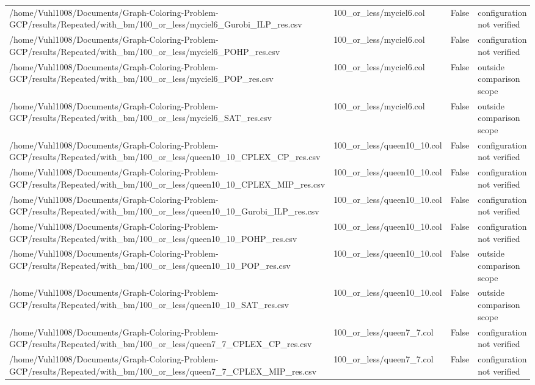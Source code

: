 \begin{table}[htbp]
\begin{tabular}{llll}
/home/Vuhl1008/Documents/Graph-Coloring-Problem-GCP/results/Repeated/with\_bm/100\_or\_less/myciel6\_Gurobi\_ILP\_res.csv & 100\_or\_less/myciel6.col & False & configuration not verified \\
/home/Vuhl1008/Documents/Graph-Coloring-Problem-GCP/results/Repeated/with\_bm/100\_or\_less/myciel6\_POHP\_res.csv & 100\_or\_less/myciel6.col & False & configuration not verified \\
/home/Vuhl1008/Documents/Graph-Coloring-Problem-GCP/results/Repeated/with\_bm/100\_or\_less/myciel6\_POP\_res.csv & 100\_or\_less/myciel6.col & False & outside comparison scope \\
/home/Vuhl1008/Documents/Graph-Coloring-Problem-GCP/results/Repeated/with\_bm/100\_or\_less/myciel6\_SAT\_res.csv & 100\_or\_less/myciel6.col & False & outside comparison scope \\
/home/Vuhl1008/Documents/Graph-Coloring-Problem-GCP/results/Repeated/with\_bm/100\_or\_less/queen10\_10\_CPLEX\_CP\_res.csv & 100\_or\_less/queen10\_10.col & False & configuration not verified \\
/home/Vuhl1008/Documents/Graph-Coloring-Problem-GCP/results/Repeated/with\_bm/100\_or\_less/queen10\_10\_CPLEX\_MIP\_res.csv & 100\_or\_less/queen10\_10.col & False & configuration not verified \\
/home/Vuhl1008/Documents/Graph-Coloring-Problem-GCP/results/Repeated/with\_bm/100\_or\_less/queen10\_10\_Gurobi\_ILP\_res.csv & 100\_or\_less/queen10\_10.col & False & configuration not verified \\
/home/Vuhl1008/Documents/Graph-Coloring-Problem-GCP/results/Repeated/with\_bm/100\_or\_less/queen10\_10\_POHP\_res.csv & 100\_or\_less/queen10\_10.col & False & configuration not verified \\
/home/Vuhl1008/Documents/Graph-Coloring-Problem-GCP/results/Repeated/with\_bm/100\_or\_less/queen10\_10\_POP\_res.csv & 100\_or\_less/queen10\_10.col & False & outside comparison scope \\
/home/Vuhl1008/Documents/Graph-Coloring-Problem-GCP/results/Repeated/with\_bm/100\_or\_less/queen10\_10\_SAT\_res.csv & 100\_or\_less/queen10\_10.col & False & outside comparison scope \\
/home/Vuhl1008/Documents/Graph-Coloring-Problem-GCP/results/Repeated/with\_bm/100\_or\_less/queen7\_7\_CPLEX\_CP\_res.csv & 100\_or\_less/queen7\_7.col & False & configuration not verified \\
/home/Vuhl1008/Documents/Graph-Coloring-Problem-GCP/results/Repeated/with\_bm/100\_or\_less/queen7\_7\_CPLEX\_MIP\_res.csv & 100\_or\_less/queen7\_7.col & False & configuration not verified \\

\end{tabular}
\end{table}
